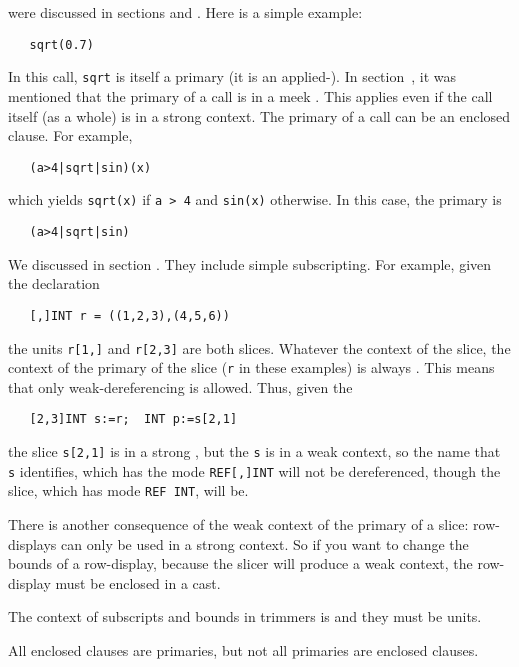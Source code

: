  were discussed in sections
 and . Here is a simple example:
\begin{verbatim}
   sqrt(0.7)
\end{verbatim}
\noindent
In this call, \verb|sqrt| is itself a primary (it is an
applied-). In
section~, it was mentioned that the primary of a
call is in a meek . This applies even if
the call itself (as a whole) is in a strong context. The primary of a
call can be an enclosed clause. For example,
\begin{verbatim}
   (a>4|sqrt|sin)(x)
\end{verbatim}
\noindent
which yields \verb|sqrt(x)| if \verb|a > 4| and \verb|sin(x)|
otherwise. In this case, the primary is
\begin{verbatim}
   (a>4|sqrt|sin)
\end{verbatim}

We discussed  in section . They
include simple subscripting.  For example, given the declaration
\begin{verbatim}
   [,]INT r = ((1,2,3),(4,5,6))
\end{verbatim}
\noindent
the units \verb|r[1,]| and \verb|r[2,3]| are both slices. Whatever the
context of the slice, the context of the primary of the slice (\verb|r|
in these examples) is always . This means that
only weak-dereferencing is allowed. Thus, given the
\begin{verbatim}
   [2,3]INT s:=r;  INT p:=s[2,1]
\end{verbatim}
\noindent
the slice \verb|s[2,1]| is in a strong ,
but the \verb|s| is in a weak context, so the name that \verb|s|
identifies, which has the mode \verb|REF[,]INT| will not be
dereferenced, though the slice, which has mode \verb|REF INT|, will
be.

%
There is another consequence of the weak context of the primary of a
slice: row-displays can only be used in a strong context. So if you
want to change the bounds of a row-display, because the slicer will
produce a weak context, the row-display must be enclosed in a cast.

The context of subscripts and bounds in trimmers is
 and they must be units.

All enclosed clauses are primaries, but not all primaries are
enclosed clauses.

